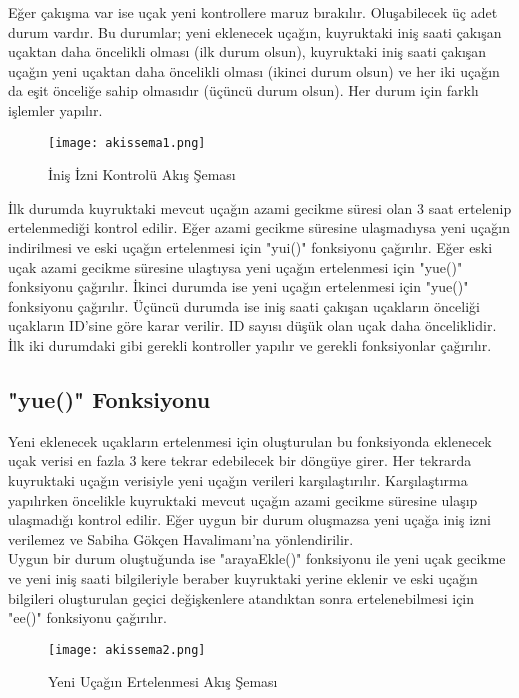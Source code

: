 \documentclass[conference]{IEEEtran}
\begin{document}
Eğer çakışma var ise uçak yeni kontrollere maruz bırakılır. Oluşabilecek üç adet 
durum vardır. Bu durumlar; yeni eklenecek uçağın, kuyruktaki iniş saati çakışan 
uçaktan daha öncelikli olması (ilk durum olsun), kuyruktaki iniş saati çakışan 
uçağın yeni uçaktan daha öncelikli olması (ikinci durum olsun) ve her iki uçağın
da eşit önceliğe sahip olmasıdır (üçüncü durum olsun). Her durum için farklı 
işlemler yapılır.\\

\begin{figure}[htbp]
\texttt{[image: akissema1.png]}
\caption{İniş İzni Kontrolü Akış Şeması}
\end{figure}

İlk durumda kuyruktaki mevcut uçağın azami gecikme süresi olan
3 saat ertelenip ertelenmediği kontrol edilir. Eğer azami gecikme süresine 
ulaşmadıysa yeni uçağın indirilmesi ve eski uçağın ertelenmesi için "yui()" 
fonksiyonu çağırılır. Eğer eski uçak azami gecikme süresine ulaştıysa yeni 
uçağın ertelenmesi için "yue()" fonksiyonu çağırılır. İkinci durumda ise yeni 
uçağın ertelenmesi için "yue()" fonksiyonu çağırılır. Üçüncü durumda ise iniş 
saati çakışan uçakların önceliği uçakların ID'sine göre karar verilir. ID sayısı
düşük olan uçak daha önceliklidir. İlk iki durumdaki gibi gerekli kontroller 
yapılır ve gerekli fonksiyonlar çağırılır.\\

\subsection{"yue()" Fonksiyonu}
Yeni eklenecek uçakların ertelenmesi için oluşturulan bu fonksiyonda eklenecek 
uçak verisi en fazla 3 kere tekrar edebilecek bir döngüye girer. Her tekrarda 
kuyruktaki uçağın verisiyle yeni uçağın verileri karşılaştırılır. Karşılaştırma 
yapılırken öncelikle kuyruktaki mevcut uçağın azami gecikme süresine ulaşıp 
ulaşmadığı kontrol edilir. Eğer uygun bir durum oluşmazsa yeni uçağa iniş izni 
verilemez ve Sabiha Gökçen Havalimanı'na yönlendirilir.\\

Uygun bir durum oluştuğunda ise "arayaEkle()" fonksiyonu ile yeni uçak gecikme ve 
yeni iniş saati bilgileriyle beraber kuyruktaki yerine eklenir ve eski uçağın 
bilgileri oluşturulan geçici değişkenlere atandıktan sonra ertelenebilmesi için 
"ee()" fonksiyonu çağırılır.\\

\begin{figure}[htbp]
\texttt{[image: akissema2.png]}
\caption{Yeni Uçağın Ertelenmesi Akış Şeması}
\end{figure}
\end{document}
